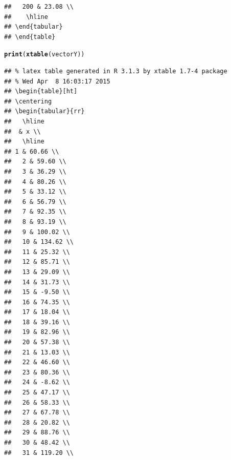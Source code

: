 \documentclass{article}\usepackage[]{graphicx}\usepackage[]{color}
\makeatletter
\newcommand{\hlstd}[1]{\textcolor[rgb]{0.345,0.345,0.345}{#1}}%
\newcommand{\hlkwd}[1]{\textcolor[rgb]{0.737,0.353,0.396}{\textbf{#1}}}%
\newenvironment{kframe}{%
 \def\at@end@of@kframe{}%
 \ifinner\ifhmode%
  \def\at@end@of@kframe{\end{minipage}}%
  \begin{minipage}{\columnwidth}%
 \fi\fi%
 \def\FrameCommand##1{\hskip\@totalleftmargin \hskip-\fboxsep
 \colorbox{shadecolor}{##1}\hskip-\fboxsep
     \hskip-\linewidth \hskip-\@totalleftmargin \hskip\columnwidth}%
 \MakeFramed {\advance\hsize-\width
   \@totalleftmargin\z@ \linewidth\hsize
   \@setminipage}}%
 {\par\unskip\endMakeFramed%
 \at@end@of@kframe}
\newenvironment{knitrout}{}{} %
\makeatother
\begin{document}
\begin{knitrout}
\begin{kframe}
\begin{verbatim}
##   200 & 23.08 \\ 
##    \hline
## \end{tabular}
## \end{table}
\end{verbatim}
\begin{alltt}
\hlkwd{print}\hlstd{(}\hlkwd{xtable}\hlstd{(vectorY))}
\end{alltt}
\begin{verbatim}
## % latex table generated in R 3.1.3 by xtable 1.7-4 package
## % Wed Apr  8 16:03:17 2015
## \begin{table}[ht]
## \centering
## \begin{tabular}{rr}
##   \hline
##  & x \\ 
##   \hline
## 1 & 60.66 \\ 
##   2 & 59.60 \\ 
##   3 & 36.29 \\ 
##   4 & 80.26 \\ 
##   5 & 33.12 \\ 
##   6 & 56.79 \\ 
##   7 & 92.35 \\ 
##   8 & 93.19 \\ 
##   9 & 100.02 \\ 
##   10 & 134.62 \\ 
##   11 & 25.32 \\ 
##   12 & 85.71 \\ 
##   13 & 29.09 \\ 
##   14 & 31.73 \\ 
##   15 & -9.50 \\ 
##   16 & 74.35 \\ 
##   17 & 18.04 \\ 
##   18 & 39.16 \\ 
##   19 & 82.96 \\ 
##   20 & 57.38 \\ 
##   21 & 13.03 \\ 
##   22 & 46.60 \\ 
##   23 & 80.36 \\ 
##   24 & -8.62 \\ 
##   25 & 47.17 \\ 
##   26 & 58.33 \\ 
##   27 & 67.78 \\ 
##   28 & 20.82 \\ 
##   29 & 88.76 \\ 
##   30 & 48.42 \\ 
##   31 & 119.20 \\ 

\end{verbatim}
\end{kframe}
\end{knitrout}
\end{document}
